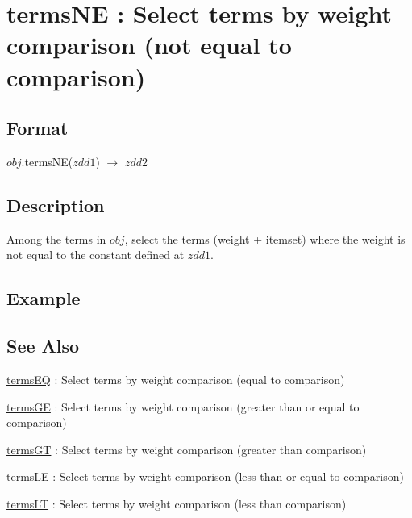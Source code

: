 
\section{termsNE : Select terms by weight comparison (not equal to comparison)\label{sect:termsNE}}
\subsection*{Format}
$obj$.termsNE($zdd1$) $\rightarrow$ $zdd2$

\subsection*{Description}
Among the terms in $obj$, select the terms (weight + itemset) where the weight is not equal to the constant defined at $zdd1$.

\subsection*{Example}


\subsection*{See Also}
\hyperref[sect:termsEQ]{termsEQ} : Select terms by weight comparison (equal to comparison)

\hyperref[sect:termsGE]{termsGE} : Select terms by weight comparison (greater than or equal to comparison)

\hyperref[sect:termsGT]{termsGT} : Select terms by weight comparison (greater than comparison)

\hyperref[sect:termsLE]{termsLE} : Select terms by weight comparison (less than or equal to comparison)

\hyperref[sect:termsLT]{termsLT} : Select terms by weight comparison (less than comparison)

